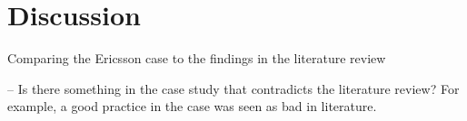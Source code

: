 
\chapter{Discussion}
\label{chapter:discussion}


Comparing the Ericsson case to the findings in the literature review

-- Is there something in the case study that contradicts the literature review?
   For example, a good practice in the case was seen as bad in literature. 
